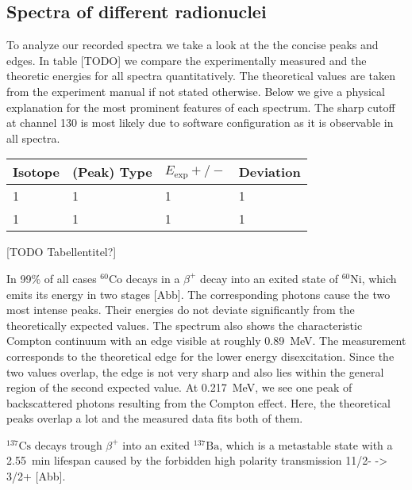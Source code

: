 \subsection{Spectra of different radionuclei}
%
To analyze our recorded spectra we take a look at the the concise peaks and edges.
In table [TODO] we compare the experimentally measured and the theoretic energies for all spectra quantitatively.
The theoretical values are taken from the experiment manual \cite{Anleitung} if not stated otherwise.
Below we give a physical explanation for the most prominent features of each spectrum.
The sharp cutoff at channel 130 is most likely due to software configuration as it is observable in all spectra.
%
\begin{multicolfloat}
\begin{center}
\begin{tabular}{llll}
\toprule
Isotope & (Peak) Type & $E_{\text{exp}} +/-$ & Deviation \\
\midrule
1 & 1 & 1 & 1 \\
1 & 1 & 1 & 1 \\
\bottomrule
\end{tabular}
\label{tab:EnergyComparison}
\end{center}
\end{multicolfloat}
[TODO Tabellentitel?]
%
\par
In 99\% of all cases \textbf{$^{60}\text{Co}$} decays in a $\beta^{+}$ decay into an exited state of $^{60}\text{Ni}$, which emits its energy in two stages [Abb].
The corresponding photons cause the two most intense peaks.
Their energies do not deviate significantly from the theoretically expected values.
The spectrum also shows the characteristic Compton continuum with an edge visible at roughly \SI{0.89}{\mega\electronvolt}.
The measurement corresponds to the theoretical edge for the lower energy disexcitation.
Since the two values overlap, the edge is not very sharp and also lies within the general region of the second expected value.
At \SI{0.217}{\mega\electronvolt}, we see one peak of backscattered photons resulting from the Compton effect.
Here, the theoretical peaks overlap a lot and the measured data fits both of them.
%
\par
\textbf{$^{137}\text{Cs}$} decays trough $\beta^{+}$ into an exited $^{137}\text{Ba}$, which is a metastable state with a \SI{2.55}{\minute} lifespan caused by the forbidden high polarity transmission 11/2- -> 3/2+ [Abb].
